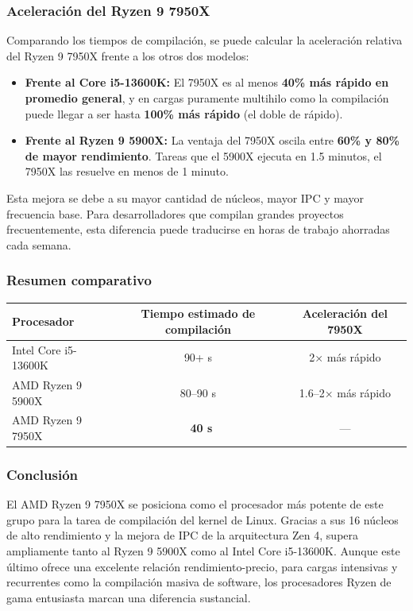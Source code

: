 \subsubsection*{Aceleración del Ryzen 9 7950X}

Comparando los tiempos de compilación, se puede calcular la aceleración relativa del Ryzen 9 7950X frente a los otros dos modelos:

\begin{itemize}
  \item \textbf{Frente al Core i5-13600K:} El 7950X es al menos \textbf{40\% más rápido en promedio general}, y en cargas puramente multihilo como la compilación puede llegar a ser hasta \textbf{100\% más rápido} (el doble de rápido).
  
  \item \textbf{Frente al Ryzen 9 5900X:} La ventaja del 7950X oscila entre \textbf{60\% y 80\% de mayor rendimiento}. Tareas que el 5900X ejecuta en 1.5 minutos, el 7950X las resuelve en menos de 1 minuto.
\end{itemize}

Esta mejora se debe a su mayor cantidad de núcleos, mayor IPC y mayor frecuencia base. Para desarrolladores que compilan grandes proyectos frecuentemente, esta diferencia puede traducirse en horas de trabajo ahorradas cada semana.

\subsubsection*{Resumen comparativo}

\begin{center}
\begin{tabular}{|p{4.5cm}|c|c|}
\hline
\textbf{Procesador} & \textbf{Tiempo estimado de compilación} & \textbf{Aceleración del 7950X} \\
\hline
Intel Core i5-13600K & 90+ s & 2× más rápido \\
\hline
AMD Ryzen 9 5900X & 80–90 s & 1.6–2× más rápido \\
\hline
AMD Ryzen 9 7950X & \textbf{~40 s} & --- \\
\hline
\end{tabular}
\end{center}

\subsubsection*{Conclusión}

El AMD Ryzen 9 7950X se posiciona como el procesador más potente de este grupo para la tarea de compilación del kernel de Linux. Gracias a sus 16 núcleos de alto rendimiento y la mejora de IPC de la arquitectura Zen 4, supera ampliamente tanto al Ryzen 9 5900X como al Intel Core i5-13600K. Aunque este último ofrece una excelente relación rendimiento-precio, para cargas intensivas y recurrentes como la compilación masiva de software, los procesadores Ryzen de gama entusiasta marcan una diferencia sustancial.



